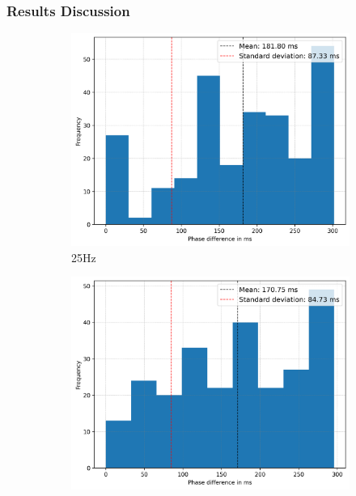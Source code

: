 \subsubsection{Results Discussion}
\begin{figure}[t]
    \begin{subfigure}{0.5\linewidth}
        \centering
        \includegraphics[width=\linewidth]{chapters/Results/histogram_25.png}
        \caption{25Hz}
        \label{fig:histogram_25}
        \vspace{1\baselineskip}
    \end{subfigure}
    \begin{subfigure}{0.5\linewidth}
        \centering
        \includegraphics[width=\linewidth]{chapters/Results/histogram_50.png}

\end{subfigure}
\end{figure}
